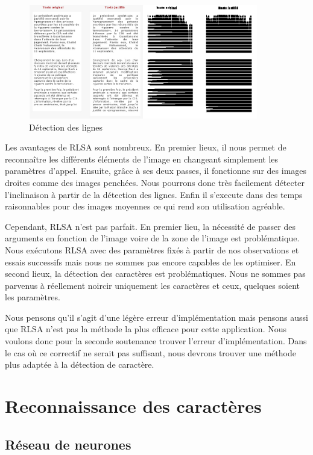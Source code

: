\documentclass[11pt]{report}
\begin{document}
\begin{figure}[htbp]
\centering
\includegraphics[width=10cm]{rlsa.png}
\caption{Détection des lignes}
\end{figure}

Les avantages de RLSA sont nombreux. En premier lieux, il nous permet de reconnaître les différents éléments de l'image en changeant simplement les paramètres d'appel. Ensuite, grâce à ses deux passes, il fonctionne sur des images droites comme des images penchées. Nous pourrons donc très facilement détecter l'inclinaison à partir de la détection des lignes. Enfin il s'execute dans des temps raisonnables pour des images moyennes ce qui rend son utilisation agréable.

Cependant, RLSA n'est pas parfait. En premier lieu, la nécessité de passer des arguments en fonction de l'image voire de la zone de l'image est problématique. Nous exécutons RLSA avec des paramètres fixés à partir de nos observations et essais successifs mais nous ne sommes pas encore capables de les optimiser. En second lieux, la détection des caractères est problématiques. Nous ne sommes pas parvenus à réellement noircir uniquement les caractères et ceux, quelques soient les paramètres.

Nous pensons qu'il s'agit d'une légère erreur d'implémentation mais pensons aussi que RLSA n'est pas la méthode la plus efficace pour cette application. Nous voulons donc pour la seconde soutenance trouver l'erreur d'implémentation. Dans le cas où ce correctif ne serait pas suffisant, nous devrons trouver une méthode plus adaptée à la détection de caractère.

\chapter{Reconnaissance des caractères}

\section{Réseau de neurones}
\end{document}
